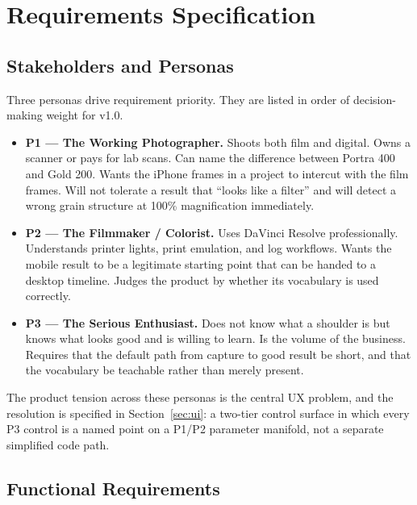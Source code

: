 \section{Requirements Specification}
\label{sec:requirements}

\subsection{Stakeholders and Personas}

Three personas drive requirement priority. They are listed in order of
decision-making weight for v1.0.

\begin{itemize}
\item \textbf{P1 --- The Working Photographer.} Shoots both film and digital.
Owns a scanner or pays for lab scans. Can name the difference between Portra
400 and Gold 200. Wants the iPhone frames in a project to intercut with the
film frames. Will not tolerate a result that ``looks like a filter'' and will
detect a wrong grain structure at 100\% magnification immediately.
\item \textbf{P2 --- The Filmmaker / Colorist.} Uses DaVinci Resolve
professionally. Understands printer lights, print emulation, and log
workflows. Wants the mobile result to be a legitimate starting point that can
be handed to a desktop timeline. Judges the product by whether its vocabulary
is used correctly.
\item \textbf{P3 --- The Serious Enthusiast.} Does not know what a shoulder is
but knows what looks good and is willing to learn. Is the volume of the
business. Requires that the default path from capture to good result be short,
and that the vocabulary be teachable rather than merely present.
\end{itemize}

The product tension across these personas is the central UX problem, and the
resolution is specified in Section~\ref{sec:ui}: a two-tier control surface in
which every P3 control is a named point on a P1/P2 parameter manifold, not a
separate simplified code path.

\subsection{Functional Requirements}

